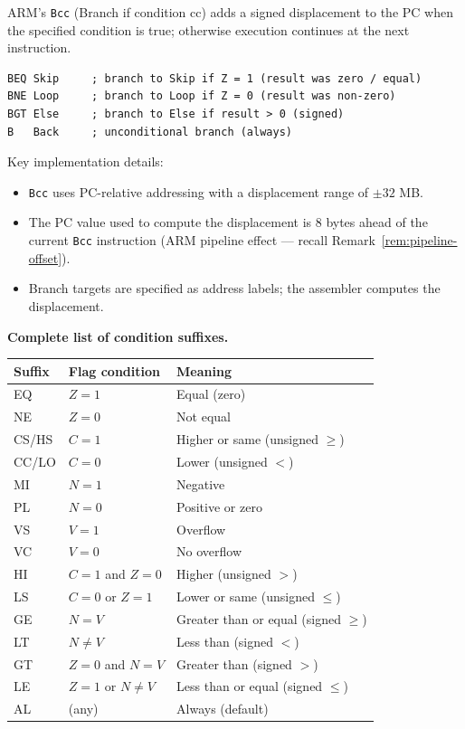 \documentclass[11pt, a4paper, notitlepage]{report}
\theoremstyle{definition}
\theoremstyle{remark}
\theoremstyle{definition}
\begin{document}
ARM's \texttt{Bcc} (Branch if condition cc) adds a signed displacement to the PC when the specified condition is true; otherwise execution continues at the next instruction.

\begin{lstlisting}
BEQ Skip     ; branch to Skip if Z = 1 (result was zero / equal)
BNE Loop     ; branch to Loop if Z = 0 (result was non-zero)
BGT Else     ; branch to Else if result > 0 (signed)
B   Back     ; unconditional branch (always)
\end{lstlisting}

Key implementation details:

\begin{itemize}
  \item \texttt{Bcc} uses PC-relative addressing with a displacement range of $\pm 32$ MB\@.
  \item The PC value used to compute the displacement is 8 bytes ahead of the current \texttt{Bcc} instruction (ARM pipeline effect --- recall Remark~\ref{rem:pipeline-offset}).
  \item Branch targets are specified as address labels; the assembler computes the displacement.
\end{itemize}

\textbf{Complete list of condition suffixes.}

\begin{center}
\begin{tabularx}{\textwidth}{llX}
\toprule
\textbf{Suffix} & \textbf{Flag condition} & \textbf{Meaning} \\
\midrule
EQ & $Z = 1$ & Equal (zero) \\
NE & $Z = 0$ & Not equal \\
CS/HS & $C = 1$ & Higher or same (unsigned $\ge$) \\
CC/LO & $C = 0$ & Lower (unsigned $<$) \\
MI & $N = 1$ & Negative \\
PL & $N = 0$ & Positive or zero \\
VS & $V = 1$ & Overflow \\
VC & $V = 0$ & No overflow \\
HI & $C = 1$ and $Z = 0$ & Higher (unsigned $>$) \\
LS & $C = 0$ or $Z = 1$ & Lower or same (unsigned $\le$) \\
GE & $N = V$ & Greater than or equal (signed $\ge$) \\
LT & $N \ne V$ & Less than (signed $<$) \\
GT & $Z = 0$ and $N = V$ & Greater than (signed $>$) \\
LE & $Z = 1$ or $N \ne V$ & Less than or equal (signed $\le$) \\
AL & (any) & Always (default) \\
\bottomrule
\end{tabularx}
\end{center}
\end{document}
